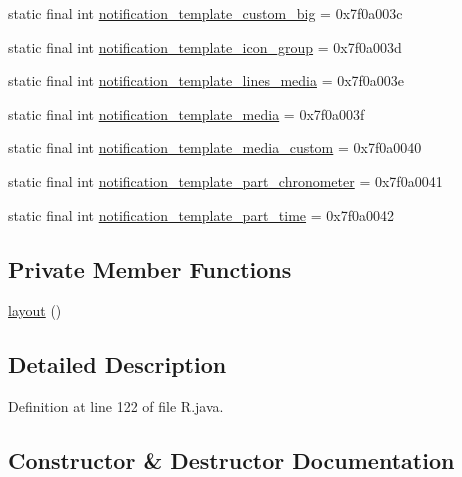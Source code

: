 \begin{DoxyCompactItemize}
static final int \mbox{\hyperlink{classandroid_1_1support_1_1mediacompat_1_1_r_1_1layout_a7cfbf2cf8fead47542cc3d9f6fa76af3}{notification\+\_\+template\+\_\+custom\+\_\+big}} = 0x7f0a003c
\item 
static final int \mbox{\hyperlink{classandroid_1_1support_1_1mediacompat_1_1_r_1_1layout_a39993db7633151eb09a67e32ea638006}{notification\+\_\+template\+\_\+icon\+\_\+group}} = 0x7f0a003d
\item 
static final int \mbox{\hyperlink{classandroid_1_1support_1_1mediacompat_1_1_r_1_1layout_ade9024eff004c3faddcf47d74582dfe8}{notification\+\_\+template\+\_\+lines\+\_\+media}} = 0x7f0a003e
\item 
static final int \mbox{\hyperlink{classandroid_1_1support_1_1mediacompat_1_1_r_1_1layout_ad4b1b9880ac48b0cdd66684e80bfa97c}{notification\+\_\+template\+\_\+media}} = 0x7f0a003f
\item 
static final int \mbox{\hyperlink{classandroid_1_1support_1_1mediacompat_1_1_r_1_1layout_ad030dc38912f4e9d3d6220e962a42065}{notification\+\_\+template\+\_\+media\+\_\+custom}} = 0x7f0a0040
\item 
static final int \mbox{\hyperlink{classandroid_1_1support_1_1mediacompat_1_1_r_1_1layout_acf044bc944b7a154c52653891074c05c}{notification\+\_\+template\+\_\+part\+\_\+chronometer}} = 0x7f0a0041
\item 
static final int \mbox{\hyperlink{classandroid_1_1support_1_1mediacompat_1_1_r_1_1layout_ac483500984025c7db556bf3c6d4cfc49}{notification\+\_\+template\+\_\+part\+\_\+time}} = 0x7f0a0042
\end{DoxyCompactItemize}
\subsection*{Private Member Functions}
\begin{DoxyCompactItemize}
\item 
\mbox{\hyperlink{classandroid_1_1support_1_1mediacompat_1_1_r_1_1layout_acf0c03b8b9c7a793fa6be4b563fbfb22}{layout}} ()
\end{DoxyCompactItemize}


\subsection{Detailed Description}


Definition at line 122 of file R.\+java.



\subsection{Constructor \& Destructor Documentation}
\mbox{\label{classandroid_1_1support_1_1mediacompat_1_1_r_1_1layout_acf0c03b8b9c7a793fa6be4b563fbfb22}} 
